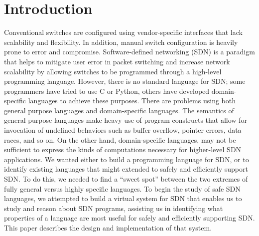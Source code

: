 
\section{Introduction}


Conventional switches are configured using vendor-specific interfaces that lack scalability and flexibility. In addition, manual switch configuration is heavily prone to error and compromise. Software-defined networking (SDN) is a paradigm that helps to mitigate user error in packet switching and increase network scalability by allowing switches to be programmed through a high-level programming language. However, there is no standard language for SDN; some programmers have tried to use C or Python, others have developed domain-specific languages to achieve these purposes. There are problems using both general purpose languages and domain-specific languages. The semantics of general purpose languages make heavy use of program constructs that allow for invocation of undefined behaviors such as buffer overflow, pointer errors, data races, and so on. On the other hand, domain-specific languages, may not be sufficient to express the kinds of computations necessary for higher-level SDN applications. We wanted either to build a programming language for SDN, or to identify existing languages that might extended to safely and efficiently support SDN. To do this, we needed to find a ``sweet spot'' between the two extremes of fully general versus highly specific languages. To begin the study of safe SDN languages, we attempted to build a virtual system for SDN that enables us to study and reason about SDN programs, assisting us in identifying what properties of a language are most useful for safely and efficiently supporting SDN. This paper describes the design and implementation of that system.


